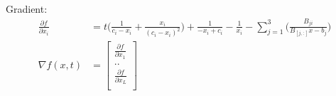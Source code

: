 \documentclass[12pt,letter]{article}
\begin{document}
\begin{enumerate}
\begin{itemize}
    \pagebreak
    
    Gradient:
    \begin{align*}
      \frac{\partial f}{\partial x_i} &= t\bigg(\frac{1}{c_i-x_i} + \frac{x_i}{(c_i-x_i)^2} \bigg) + \frac{1}{-x_i+c_i} - \frac{1}{x_i} - \sum_{j=1}^{3}\bigg(\frac{B_{ji}}{B_{[j,:]}x-b_j}\bigg)\\
      \nabla f(x,t) & =
                      \begin{bmatrix}
                        \frac{\partial f}{\partial x_1}\\
                        ..\\
                        \frac{\partial f}{\partial x_L}\\
                      \end{bmatrix}
    \end{align*}

\end{itemize}
\end{enumerate}
\end{document}
